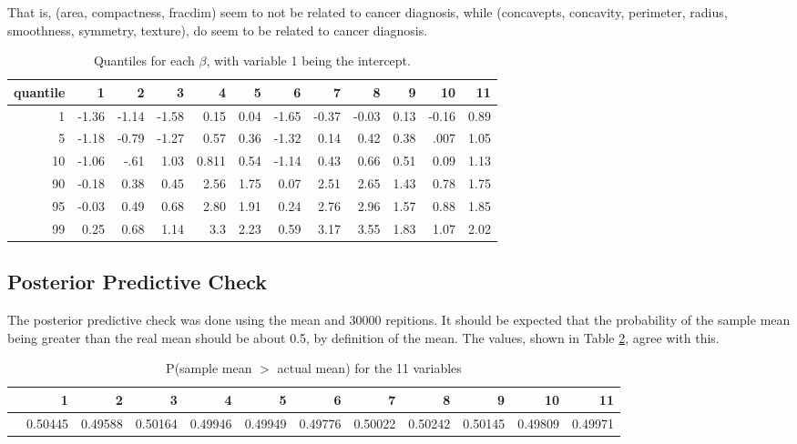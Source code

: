 \documentclass{article}
\begin{document}
That is, (area, compactness, fracdim) seem to not be related to cancer diagnosis, while (concavepts, concavity, perimeter, radius, smoothness, symmetry, texture), do seem to be related to cancer diagnosis. 

\begin{table}[!ht]
\centering
\begin{tabular}{|r|rrrrrrrrrrr|}
\hline
quantile & 1 & 2 & 3 & 4 & 5 & 6 & 7 & 8 & 9 & 10 & 11 \\ 
\hline
1 & -1.36 & -1.14 & -1.58 & 0.15 & 0.04 & -1.65 & -0.37 & -0.03 & 0.13 & -0.16 & 0.89 \\
5 & -1.18 & -0.79 & -1.27 & 0.57 & 0.36 & -1.32 & 0.14 & 0.42 & 0.38 & .007 & 1.05 \\
10 & -1.06 & -.61 & 1.03 & 0.811 &0.54 & -1.14 & 0.43 & 0.66 & 0.51 & 0.09 & 1.13 \\
90 & -0.18 & 0.38 & 0.45 & 2.56 & 1.75 & 0.07 & 2.51 & 2.65 & 1.43 & 0.78 & 1.75 \\
95 & -0.03 & 0.49 & 0.68 & 2.80 & 1.91 & 0.24 & 2.76 & 2.96 & 1.57 & 0.88 & 1.85 \\
99 & 0.25 & 0.68 & 1.14 & 3.3 & 2.23 & 0.59 & 3.17 & 3.55 & 1.83 & 1.07 & 2.02 \\
\hline
\end{tabular}
\caption{Quantiles for each $\beta$, with variable 1 being the intercept.}
\label{breastQuantiles}
\end{table}

\subsection{Posterior Predictive Check}

The posterior predictive check was done using the mean and 30000 repitions. It should be expected that the probability of the sample mean being greater than the real mean should be about 0.5, by definition of the mean. The values, shown in Table \ref{probabilities}, agree with this.

\begin{table}[!ht]
\centering
\begin{tabular}{|rrrrrrrrrrrr|}
\hline
& 1 & 2 & 3 & 4 & 5 & 6 & 7 & 8 & 9 & 10 & 11\\
\hline
& 0.50445 & 0.49588 & 0.50164 & 0.49946 & 0.49949 & 0.49776 & 0.50022 & 0.50242 & 0.50145 & 0.49809 & 0.49971 \\
\hline
\end{tabular}
\caption{P(sample mean $>$ actual mean) for the 11 variables}
\label{probabilities}
\end{table}
\end{document}
